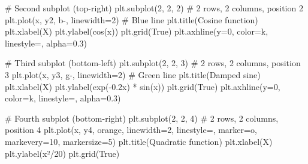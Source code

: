 \documentclass[
  english,
  letterpaper,
  DIV=11,
  numbers=noendperiod]{scrreprt}
\newenvironment{Shaded}{\begin{snugshade}}{\end{snugshade}}
\newcommand{\CommentTok}[1]{\textcolor[rgb]{0.37,0.37,0.37}{#1}}
\newcommand{\DecValTok}[1]{\textcolor[rgb]{0.68,0.00,0.00}{#1}}
\newcommand{\FloatTok}[1]{\textcolor[rgb]{0.68,0.00,0.00}{#1}}
\newcommand{\NormalTok}[1]{\textcolor[rgb]{0.00,0.23,0.31}{#1}}
\newcommand{\OperatorTok}[1]{\textcolor[rgb]{0.37,0.37,0.37}{#1}}
\newcommand{\StringTok}[1]{\textcolor[rgb]{0.13,0.47,0.30}{#1}}
\newcommand{\VariableTok}[1]{\textcolor[rgb]{0.07,0.07,0.07}{#1}}
\begin{document}
\begin{Shaded}
\begin{Highlighting}[]
\CommentTok{\# Second subplot (top{-}right)}
\NormalTok{plt.subplot(}\DecValTok{2}\NormalTok{, }\DecValTok{2}\NormalTok{, }\DecValTok{2}\NormalTok{)  }\CommentTok{\# 2 rows, 2 columns, position 2}
\NormalTok{plt.plot(x, y2, }\StringTok{\textquotesingle{}b{-}\textquotesingle{}}\NormalTok{, linewidth}\OperatorTok{=}\DecValTok{2}\NormalTok{)  }\CommentTok{\# Blue line}
\NormalTok{plt.title(}\StringTok{\textquotesingle{}Cosine function\textquotesingle{}}\NormalTok{)}
\NormalTok{plt.xlabel(}\StringTok{\textquotesingle{}X\textquotesingle{}}\NormalTok{)}
\NormalTok{plt.ylabel(}\StringTok{\textquotesingle{}cos(x)\textquotesingle{}}\NormalTok{)}
\NormalTok{plt.grid(}\VariableTok{True}\NormalTok{)}
\NormalTok{plt.axhline(y}\OperatorTok{=}\DecValTok{0}\NormalTok{, color}\OperatorTok{=}\StringTok{\textquotesingle{}k\textquotesingle{}}\NormalTok{, linestyle}\OperatorTok{=}\StringTok{\textquotesingle{}{-}\textquotesingle{}}\NormalTok{, alpha}\OperatorTok{=}\FloatTok{0.3}\NormalTok{)}

\CommentTok{\# Third subplot (bottom{-}left)}
\NormalTok{plt.subplot(}\DecValTok{2}\NormalTok{, }\DecValTok{2}\NormalTok{, }\DecValTok{3}\NormalTok{)  }\CommentTok{\# 2 rows, 2 columns, position 3}
\NormalTok{plt.plot(x, y3, }\StringTok{\textquotesingle{}g{-}\textquotesingle{}}\NormalTok{, linewidth}\OperatorTok{=}\DecValTok{2}\NormalTok{)  }\CommentTok{\# Green line}
\NormalTok{plt.title(}\StringTok{\textquotesingle{}Damped sine\textquotesingle{}}\NormalTok{)}
\NormalTok{plt.xlabel(}\StringTok{\textquotesingle{}X\textquotesingle{}}\NormalTok{)}
\NormalTok{plt.ylabel(}\StringTok{\textquotesingle{}exp({-}0.2x) * sin(x)\textquotesingle{}}\NormalTok{)}
\NormalTok{plt.grid(}\VariableTok{True}\NormalTok{)}
\NormalTok{plt.axhline(y}\OperatorTok{=}\DecValTok{0}\NormalTok{, color}\OperatorTok{=}\StringTok{\textquotesingle{}k\textquotesingle{}}\NormalTok{, linestyle}\OperatorTok{=}\StringTok{\textquotesingle{}{-}\textquotesingle{}}\NormalTok{, alpha}\OperatorTok{=}\FloatTok{0.3}\NormalTok{)}

\CommentTok{\# Fourth subplot (bottom{-}right)}
\NormalTok{plt.subplot(}\DecValTok{2}\NormalTok{, }\DecValTok{2}\NormalTok{, }\DecValTok{4}\NormalTok{)  }\CommentTok{\# 2 rows, 2 columns, position 4}
\NormalTok{plt.plot(x, y4, }\StringTok{\textquotesingle{}orange\textquotesingle{}}\NormalTok{, linewidth}\OperatorTok{=}\DecValTok{2}\NormalTok{, linestyle}\OperatorTok{=}\StringTok{\textquotesingle{}{-}{-}\textquotesingle{}}\NormalTok{, marker}\OperatorTok{=}\StringTok{\textquotesingle{}o\textquotesingle{}}\NormalTok{, markevery}\OperatorTok{=}\DecValTok{10}\NormalTok{, markersize}\OperatorTok{=}\DecValTok{5}\NormalTok{)}
\NormalTok{plt.title(}\StringTok{\textquotesingle{}Quadratic function\textquotesingle{}}\NormalTok{)}
\NormalTok{plt.xlabel(}\StringTok{\textquotesingle{}X\textquotesingle{}}\NormalTok{)}
\NormalTok{plt.ylabel(}\StringTok{\textquotesingle{}x²/20\textquotesingle{}}\NormalTok{)}
\NormalTok{plt.grid(}\VariableTok{True}\NormalTok{)}


\end{Highlighting}
\end{Shaded}
\end{document}
